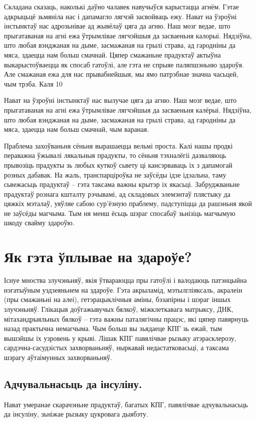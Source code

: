 Складана сказаць, наколькі даўно чалавек навучыўся карыстацца агнём. Гэтае адкрыцьцё зьмяніла нас і дапамагло лягчэй засвойваць ежу. Нават на ўзроўні інстынктаў нас адрозьнівае ад жывёлаў цяга да агню. Наш мозг ведае, што прыгатаваная на агні ежа ўтрымлівае лягчэйшыя да засваеньня калорыі. Нядзіўна, што любая вэнджаная на дыме, засмажаная на грылі страва, ад гародніны да мяса, здаецца нам больш смачнай. Цяпер смажаньне прадуктаў актыўна выкарыстоўваецца як спосаб гатоўлі, але гэта не спрыяе паляпшэньню здароўя. Але смажаная ежа для нас прывабнейшыя, мы ямо патрэбнае значна часьцей, чым трэба. Каля 10%

Нават на ўзроўні інстынктаў нас вылучае цяга да агню. Наш мозг ведае, што прыгатаваная на агні ежа ўтрымлівае лягчэйшыя да засваеньня калёрыі. Нядзіўна, што любая вэнджаная на дыме, засмажаная на грылі страва, ад гародніны да мяса, здаецца нам больш смачнай, чым вараная.

Праблема захоўваньня сёньня вырашаецца вельмі проста. Калі нашы продкі пераважна ўжывалі лякальныя прадукты, то сёньня тэхналёгіі дазваляюць прывозіць прадукты зь любых куткоў сьвету ці кансэрваваць іх з дапамогай розных дабавак. На жаль, транспарціроўка не заўсёды ідзе ідэальна, таму сьвежасьць прадуктаў – гэта таксама важны крытэр іх якасьці. Забруджваньне прадуктаў рознага кшталту рэчывамі, ад складовых элемэнтаў плястыку да цяжкіх мэталаў, уяўляе сабою сур'ёзную праблему, падступіцца да рашэньня якой не заўсёды магчыма. Тым ня менш ёсьць шэраг спосабаў зьнізіць магчымую шкоду свайму здароўю.

\section{Як гэта ўплывае на здароўе?}

Існуе мноства злучэньняў, якія ўтвараюцца пры гатоўлі і валодаюць патэнцыйна нэгатыўным уздзеяньнем на здароўе. Гэта акрыламід, мэтылгліяксаль, акралеін (пры смажаньні на алеі), гетэрацыклічныя аміны, бэзапірны і шэраг іншых злучэньняў. Глікацыя доўгажывучых бялкоў, міжклеткавага матрыксу, ДНК, мітахандрыяльных бялкоў – гэта важны паталягічны працэс, які цяпер павярнуць назад практычна немагчыма. Чым больш вы зьядаеце КПГ зь ежай, тым вышэйшы іх узровень у крыві. Лішак КПГ павялічвае рызыку атэрасклерозу, сардэчна-сасудзістых захворваньняў, ныркавай недастатковасьці, а таксама шэрагу аўтаімунных захворваньняў.

\subsection{Адчувальнасьць да інсуліну.}
Нават умеранае скарачэньне прадуктаў, багатых КПГ, павялічвае адчувальнасьць да інсуліну, зьніжае рызыку цукровага дыябэту.

